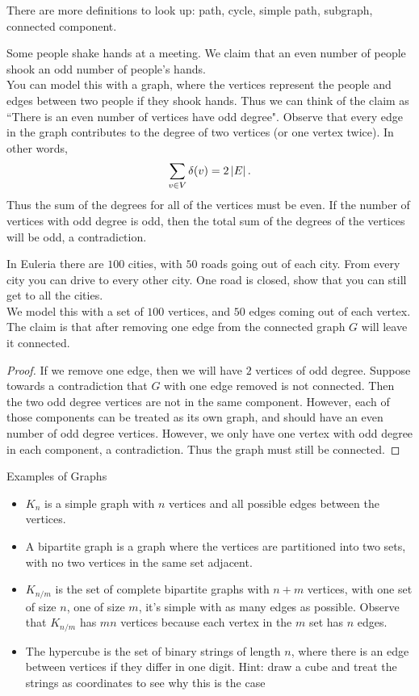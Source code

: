 \documentclass[class=article, crop=false]{standalone}
\begin{document}
  There are more definitions to look up: path, cycle, simple path, subgraph, connected component.
  \begin{example}{}
    Some people shake hands at a meeting. We claim that an even number of people shook an odd number of people's hands. \\[10pt]
    You can model this with a graph, where the vertices represent the people and edges between two people if they shook hands. Thus we can think of the claim as ``There is an even number of vertices have odd degree". Observe that every edge in the graph contributes to the degree of two vertices (or one vertex twice). In other words,
    \[
      \sum_{v\in V} \delta(v) = 2 \left\lvert E \right\rvert.
    \]
    Thus the sum of the degrees for all of the vertices must be even. If the number of vertices with odd degree is odd, then the total sum of the degrees of the vertices will be odd, a contradiction.
  \end{example}
  \begin{example}{}
    In Euleria there are $100$ cities, with $50$ roads going out of each city. From every city you can drive to every other city. One road is closed, show that you can still get to all the cities. \\[10pt]
    We model this with a set of $100$ vertices, and $50$ edges coming out of each vertex. The claim is that after removing one edge from the connected graph $G$ will leave it connected.
    \begin{proof}
      If we remove one edge, then we will have $2$ vertices of odd degree. Suppose towards a contradiction that $G$ with one edge removed is not connected. Then the two odd degree vertices are not in the same component. However, each of those components can be treated as its own graph, and should have an even number of odd degree vertices. However, we only have one vertex with odd degree in each component, a contradiction. Thus the graph must still be connected.
    \end{proof}
  \end{example}
  \begin{example}{Examples of Graphs}
    \begin{itemize}
      \item $K_n$ is a simple graph with $n$ vertices and all possible edges between the vertices.
      \item A bipartite graph is a graph where the vertices are partitioned into two sets, with no two vertices in the same set adjacent.
      \item $K_{n/m}$ is the set of complete bipartite graphs with $n+m$ vertices, with one set of size $n$, one of size $m$, it's simple with as many edges as possible. Observe that $K_{n/m}$ has $mn$ vertices because each vertex in the $m$ set has $n$ edges.
      \item The hypercube is the set of binary strings of length $n$, where there is an edge between vertices if they differ in one digit. Hint: draw a cube and treat the strings as coordinates to see why this is the case
    \end{itemize}
  \end{example}
\end{document}
